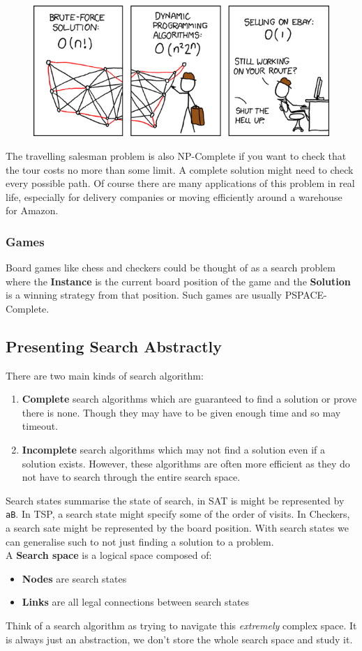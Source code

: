 \documentclass{article}
\newcommand{\n}[0]{\\[\baselineskip]}
\begin{document}
\begin{figure}[H]
\centering
\includegraphics[width=1\textwidth, keepaspectratio]{imgs/tsp.png}
\end{figure}
\noindent
The travelling salesman problem is also NP-Complete if you want to check that the tour costs no more than some limit. A complete solution might need to check every possible path. Of course there are many applications of this problem in real life, especially for delivery companies or moving efficiently around a warehouse for Amazon.

\subsubsection{Games}
Board games like chess and checkers could be thought of as a search problem where the \textbf{Instance} is the current board position of the game and the \textbf{Solution} is a winning strategy from that position. Such games are usually PSPACE-Complete.

\subsection{Presenting Search Abstractly}
There are two main kinds of search algorithm:
\begin{enumerate}
\item \textbf{Complete} search algorithms which are guaranteed to find a solution or prove there is none. Though they may have to be given enough time and so may timeout.
\item \textbf{Incomplete} search algorithms which may not find a solution even if a solution exists. However, these algorithms are often more efficient as they do not have to search through the entire search space.
\end{enumerate}
\noindent
Search states summarise the state of search, in SAT is might be represented by \texttt{aB}. In TSP, a search state might specify some of the order of visits. In Checkers, a search sate might be represented by the board position. With search states we can generalise such to not just finding a solution to a problem.
\n
A \textbf{Search space} is a logical space composed of:
\begin{itemize}
\item \textbf{Nodes} are search states
\item \textbf{Links} are all legal connections between search states
\end{itemize} 
\noindent
Think of a search algorithm as trying to navigate this \textit{extremely} complex space. It is always just an abstraction, we don't store the whole search space and study it.
\end{document}
